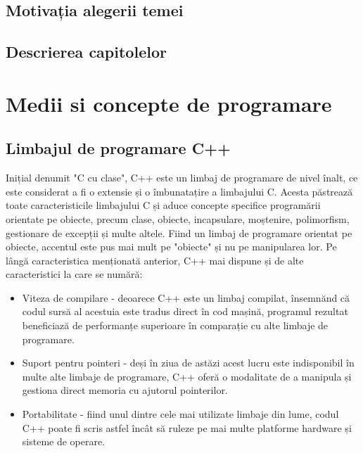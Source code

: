 \documentclass[12pt]{article}
\begin{document}
\subsection{Motivația alegerii temei}

\subsection{Descrierea capitolelor}

\section{Medii si concepte de programare}

\subsection{Limbajul de programare C++}

Inițial denumit "C cu clase", C++ este un limbaj de programare de nivel \^{i}nalt, ce este considerat a fi o extensie și o \^{i}mbunatațire a limbajului C. Acesta p\u{a}streaz\u{a} toate caracteristicile limbajului C și aduce concepte specifice program\u{a}rii orientate pe obiecte, precum clase, obiecte, incapsulare, moștenire, polimorfism, gestionare de excepții și multe altele. Fiind un limbaj de programare orientat pe obiecte, accentul este pus mai mult pe "obiecte" și nu pe manipularea lor. Pe l\^{a}ng\u{a} caracteristica menționat\u{a} anterior, C++ mai dispune și de alte caracteristici la care se num\u{a}r\u{a}: 

\begin{itemize}
    \item Viteza de compilare - deoarece C++ este un limbaj compilat, \^{i}nsemn\u{a}nd c\u{a} codul surs\u{a} al acestuia este tradus direct \^{i}n cod mașin\u{a}, programul rezultat beneficiaz\u{a} de performanțe superioare \^{i}n comparație cu alte limbaje de programare.
    \item Suport pentru pointeri - deși \^{i}n ziua de ast\u{a}zi acest lucru este indisponibil \^{i}n multe alte limbaje de programare, C++ ofer\u{a} o modalitate de a manipula și gestiona direct memoria cu ajutorul pointerilor.
    \item Portabilitate - fiind unul dintre cele mai utilizate limbaje din lume, codul C++ poate fi scris astfel \^{i}nc\^{a}t s\u{a} ruleze pe mai multe platforme hardware și sisteme de operare.
    
\end{itemize}
\end{document}
